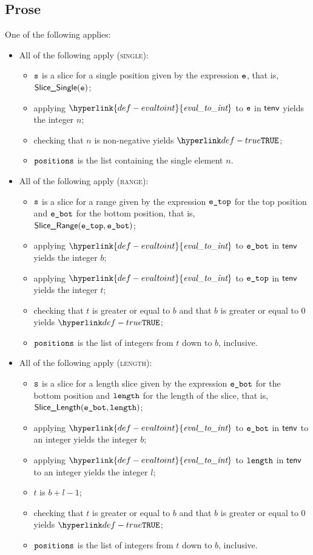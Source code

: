 \documentclass{book}
\newcommand\ProseOrTypeError[0]{\ProseTerminateAs{\TypeErrorConfig}}
\newcommand\evaltoint[0]{\hyperlink{def-evaltoint}{\textfunc{eval\_to\_int}}}
\begin{document}
\subsection{Prose}
One of the following applies:
\begin{itemize}
  \item All of the following apply (\textsc{single}):
  \begin{itemize}
    \item $\texttt{s}$ is a slice for a single position given by the expression $\texttt{e}$, that is, \\ $\textsf{Slice\_Single}(\texttt{e})$;
    \item applying $\evaltoint$ to $\texttt{e}$ in $\textsf{tenv}$ yields the integer $n$\ProseOrTypeError;
    \item checking that $n$ is non-negative yields $\True$\ProseOrTypeError;
    \item $\texttt{positions}$ is the list containing the single element $n$.
  \end{itemize}

  \item All of the following apply (\textsc{range}):
  \begin{itemize}
    \item $\texttt{s}$ is a slice for a range given by the expression $\texttt{e\_top}$
          for the top position and $\texttt{e\_bot}$ for the bottom position, that is, \\ $\textsf{Slice\_Range}(\texttt{e\_top}, \texttt{e\_bot})$;
    \item applying $\evaltoint$ to $\texttt{e\_bot}$ in $\textsf{tenv}$ yields the integer $b$\ProseOrTypeError;
    \item applying $\evaltoint$ to $\texttt{e\_top}$ in $\textsf{tenv}$ yields the integer $t$\ProseOrTypeError;
    \item checking that $t$ is greater or equal to $b$ and that $b$ is greater or equal to $0$ yields $\True$\ProseOrTypeError;
    \item $\texttt{positions}$ is the list of integers from $t$ down to $b$, inclusive.
  \end{itemize}

  \item All of the following apply (\textsc{length}):
  \begin{itemize}
    \item $\texttt{s}$ is a slice for a length slice given by the expression $\texttt{e\_bot}$
          for the bottom position and $\texttt{length}$ for the length of the slice, that is, \\ $\textsf{Slice\_Length}(\texttt{e\_bot}, \texttt{length})$;
    \item applying $\evaltoint$ to $\texttt{e\_bot}$ in $\textsf{tenv}$ to an integer yields the integer $b$\ProseOrTypeError;
    \item applying $\evaltoint$ to $\texttt{length}$ in $\textsf{tenv}$ to an integer yields the integer $l$\ProseOrTypeError;
    \item $t$ is $b + l - 1$;
    \item checking that $t$ is greater or equal to $b$ and that $b$ is greater or equal to $0$ yields $\True$\ProseOrTypeError;
    \item $\texttt{positions}$ is the list of integers from $t$ down to $b$, inclusive.
  \end{itemize}


\end{itemize}
\end{document}
